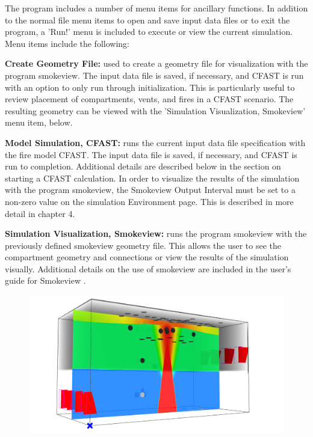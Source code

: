 The program includes a number of menu items for ancillary functions.  In addition to the normal file menu items to open and save input data files or to exit the program, a 'Run!' menu is included to execute or view the current simulation. Menu items include the following:

\textbf{Create Geometry File:} used to create a geometry file for visualization with the program smokeview.  The input data file is saved, if necessary, and CFAST is run with an option to only run through initialization. This is particularly useful to review placement of compartments, vents, and fires in a CFAST scenario. The resulting geometry can be viewed with the 'Simulation Visualization, Smokeview' menu item, below.

\textbf{Model Simulation, CFAST:} runs the current input data file specification with the fire model CFAST.  The input data file is saved, if necessary, and CFAST is run to completion.  Additional details are described below in the section on starting a CFAST calculation. In order to visualize the results of the simulation with the program smokeview, the Smokeview Output Interval must be set to a non-zero value on the simulation Environment page.  This is described in more detail in chapter 4.

\textbf{Simulation Visualization, Smokeview:} runs the program smokeview with the previously defined smokeview geometry file. This allows the user to see the compartment geometry and connections or view the results of the simulation visually.  Additional details on the use of smokeview are included in the user's guide for Smokeview \cite{Smokeview_Users_Guide_6}.

\begin{figure}[h!]
\begin{center}
\includegraphics[width=6.5in]{FIGURES/Running_CFAST/Smokeview_Sample}
\end{center}
\end{figure}

